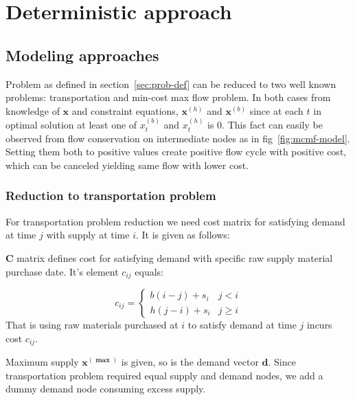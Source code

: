 
\chapter{Deterministic approach}
\label{chap:Deterministic approach}

\section{Modeling approaches}

Problem as defined in section~\ref{sec:prob-def} can be reduced to two well known problems: transportation and min-cost max flow problem. In both cases from knowledge of $\mathbf{x}$ and constraint equations, $\mathbf{x}^{(h)}$ and $\mathbf{x}^{(b)}$ since at each $t$ in optimal solution at least one of $x^{(b)}_t$ and $x^{(h)}_t$ is $0$. This fact can easily be observed from flow conservation on intermediate nodes as in fig~\ref{fig:mcmf-model}. Setting them both to positive values create positive flow cycle with positive cost, which can be canceled yielding same flow with lower cost.

\subsection{Reduction to transportation problem}
\label{subs:trans}

For transportation problem reduction we need cost matrix for satisfying demand at time $j$ with supply at time $i$. It is given as follows:

\begin{definition}{$\mathbf{C}$}
matrix defines cost for satisfying demand with specific raw supply material purchase date. It's element $c_{ij}$ equals:

\begin{equation*}
    c_{ij} = \begin{cases}
        b \left( i - j \right) + s_i & j < i \\
        h \left( j - i \right) + s_i & j \ge i
    \end{cases}
\end{equation*}
That is using raw materials purchased at $i$ to satisfy demand at time $j$ incurs cost $c_{ij}$.
\end{definition}

Maximum supply $\mathbf{x^{(\max)}}$ is given, so is the demand vector $\mathbf{d}$. Since transportation problem required equal supply and demand nodes, we add a dummy demand node consuming excess supply.

